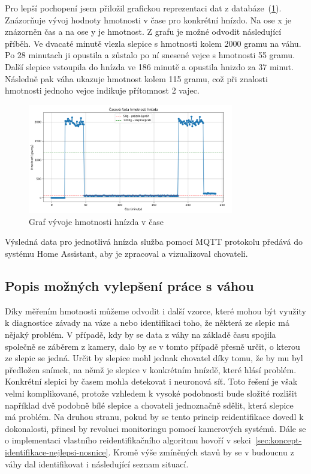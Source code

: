 Pro lepší pochopení jsem přiložil grafickou reprezentaci dat z databáze~(\ref{fig:weight_egg_chart_timeline}).
Znázorňuje vývoj hodnoty hmotnosti v čase pro konkrétní hnízdo.
Na ose x je znázorněn čas a na ose y je hmotnost.
Z grafu je možné odvodit následující příběh.
Ve dvacaté minutě vlezla slepice s hmotnosti kolem 2000 gramu na váhu.
Po 28 minutach ji opustila a zůstalo po ní snesené vejce s hmotnosti 55 gramu.
Další slepice vstoupila do hnízda ve 186 minutě a opustila hnizdo za 37 minut.
Následně pak váha ukazuje hmotnost kolem 115 gramu, což při znalosti hmotnosti jednoho vejce indikuje přítomnost 2 vajec.


\begin{figure}[h]
    \centering
    \includegraphics[width=0.8\textwidth]{img/weight_egg_chart_timeline}
    \caption{Graf vývoje hmotnosti hnízda v čase}
    \label{fig:weight_egg_chart_timeline}
\end{figure}

Výsledná data pro jednotlivá hnízda služba pomocí MQTT protokolu předává do systému Home Assistant, aby je zpracoval a vizualizoval chovateli.

\newline


\subsection*{Popis možných vylepšení práce s váhou}
Díky měřením hmotnosti můžeme odvodit i další vzorce, které mohou být využity k diagnostice závady na váze a nebo identifikaci toho, že některá ze slepic má nějaký problém.
V případě, kdy by se data z váhy na základě času spojila společně se záběrem z kamery, dalo by se v tomto případě přesně určit, o kterou ze slepic se jedná. \newline
Určit by slepice mohl jednak chovatel díky tomu, že by mu byl předložen snímek, na němž je slepice v konkrétním hnízdě, které hlásí problém.
Konkrétní slepici by časem mohla detekovat i neuronová síť. \newline
Toto řešení je však velmi komplikované, protože vzhledem k vysoké podobnosti bude složité rozlišit například dvě podobně bílé slepice a chovateli jednoznačně sdělit, která slepice má problém.
Na druhou stranu, pokud by se tento princip reidentifikace dovedl k dokonalosti, přinesl by revoluci monitoringu pomocí kamerových systémů.
Dále se o implementaci vlastního reidentifikačního algoritmu hovoří v sekci~\ref{sec:koncept-identifikace-nejlepsi-nosnice}.
\newline
Kromě výše zmíněných stavů by se v budoucnu z váhy dal identifikovat i následující seznam situací.

